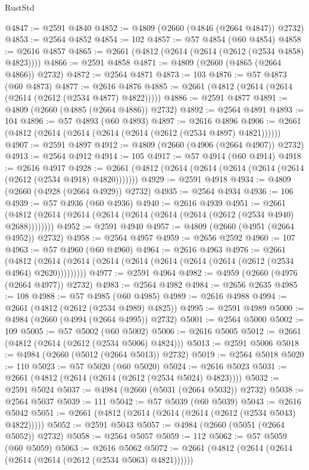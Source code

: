 \begin{lexlean}{RustStd}
\begin{coremodule}
@4847 := @2591 @4840
@4852 := @4809 (@2660 (@4846 (@2664 @4847)) @2732)
@4853 := @2564 @4852
@4854 := 102
@4857 := @57 @4854 (@60 @4854)
@4858 := @2616 @4857
@4865 := @2661 (@4812 (@2614 (@2614 (@2612 (@2534 @4858) @4823))))
@4866 := @2591 @4858
@4871 := @4809 (@2660 (@4865 (@2664 @4866)) @2732)
@4872 := @2564 @4871
@4873 := 103
@4876 := @57 @4873 (@60 @4873)
@4877 := @2616 @4876
@4885 := @2661 (@4812 (@2614 (@2614 (@2614 (@2612 (@2534 @4877) @4822)))))
@4886 := @2591 @4877
@4891 := @4809 (@2660 (@4885 (@2664 @4886)) @2732)
@4892 := @2564 @4891
@4893 := 104
@4896 := @57 @4893 (@60 @4893)
@4897 := @2616 @4896
@4906 := @2661 (@4812 (@2614 (@2614 (@2614 (@2614 (@2612 (@2534 @4897) @4821))))))
@4907 := @2591 @4897
@4912 := @4809 (@2660 (@4906 (@2664 @4907)) @2732)
@4913 := @2564 @4912
@4914 := 105
@4917 := @57 @4914 (@60 @4914)
@4918 := @2616 @4917
@4928 := @2661 (@4812 (@2614 (@2614 (@2614 (@2614 (@2614 (@2612 (@2534 @4918) @4820)))))))
@4929 := @2591 @4918
@4934 := @4809 (@2660 (@4928 (@2664 @4929)) @2732)
@4935 := @2564 @4934
@4936 := 106
@4939 := @57 @4936 (@60 @4936)
@4940 := @2616 @4939
@4951 := @2661 (@4812 (@2614 (@2614 (@2614 (@2614 (@2614 (@2614 (@2612 (@2534 @4940) @2688))))))))
@4952 := @2591 @4940
@4957 := @4809 (@2660 (@4951 (@2664 @4952)) @2732)
@4958 := @2564 @4957
@4959 := @2656 @2592
@4960 := 107
@4963 := @57 @4960 (@60 @4960)
@4964 := @2616 @4963
@4976 := @2661
    (@4812 (@2614 (@2614 (@2614 (@2614 (@2614 (@2614 (@2614 (@2612 (@2534 @4964) @2620)))))))))
@4977 := @2591 @4964
@4982 := @4959 (@2660 (@4976 (@2664 @4977)) @2732)
@4983 := @2564 @4982
@4984 := @2656 @2635
@4985 := 108
@4988 := @57 @4985 (@60 @4985)
@4989 := @2616 @4988
@4994 := @2661 (@4812 (@2612 (@2534 @4989) @4825))
@4995 := @2591 @4989
@5000 := @4984 (@2660 (@4994 (@2664 @4995)) @2732)
@5001 := @2564 @5000
@5002 := 109
@5005 := @57 @5002 (@60 @5002)
@5006 := @2616 @5005
@5012 := @2661 (@4812 (@2614 (@2612 (@2534 @5006) @4824)))
@5013 := @2591 @5006
@5018 := @4984 (@2660 (@5012 (@2664 @5013)) @2732)
@5019 := @2564 @5018
@5020 := 110
@5023 := @57 @5020 (@60 @5020)
@5024 := @2616 @5023
@5031 := @2661 (@4812 (@2614 (@2614 (@2612 (@2534 @5024) @4823))))
@5032 := @2591 @5024
@5037 := @4984 (@2660 (@5031 (@2664 @5032)) @2732)
@5038 := @2564 @5037
@5039 := 111
@5042 := @57 @5039 (@60 @5039)
@5043 := @2616 @5042
@5051 := @2661 (@4812 (@2614 (@2614 (@2614 (@2612 (@2534 @5043) @4822)))))
@5052 := @2591 @5043
@5057 := @4984 (@2660 (@5051 (@2664 @5052)) @2732)
@5058 := @2564 @5057
@5059 := 112
@5062 := @57 @5059 (@60 @5059)
@5063 := @2616 @5062
@5072 := @2661 (@4812 (@2614 (@2614 (@2614 (@2614 (@2612 (@2534 @5063) @4821))))))

\end{coremodule}
\end{lexlean}
